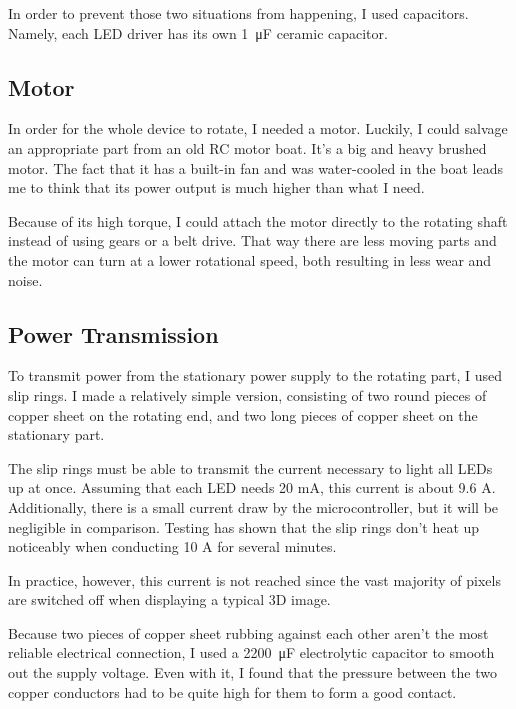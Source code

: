 \documentclass[a4paper, 11pt, titlepage]{report}
\begin{document}
In order to prevent those two situations from happening, I used capacitors. Namely, each LED
driver has its own \SI{1}{\micro\farad}  ceramic capacitor.



\subsection{Motor}

In order for the whole device to rotate, I needed a motor. Luckily, I could salvage an appropriate
part from an old RC motor boat. It's a big and heavy brushed motor. The fact that it has a built-in
fan and was water-cooled in the boat leads me to think that its power output is much higher than
what I need.

Because of its high torque, I could attach the motor directly to the rotating shaft instead of
using gears or a belt drive. That way there are less moving parts and the motor can turn at a lower
rotational speed, both resulting in less wear and noise.



\subsection{Power Transmission}

To transmit power from the stationary power supply to the rotating part, I used slip rings. I made
a relatively simple version, consisting of two round pieces of copper sheet on the rotating end,
and two long pieces of copper sheet on the stationary part.

The slip rings must be able to transmit the current necessary to light all LEDs up at once.
Assuming that each LED needs 20 mA, this current is about 9.6 A. Additionally, there is a small
current draw by the microcontroller, but it will be negligible in comparison. Testing has shown
that the slip rings don't heat up noticeably when conducting 10 A for several minutes.

In practice, however, this current is not reached since the vast majority of pixels are
switched off when displaying a typical 3D image.

Because two pieces of copper sheet rubbing against each other aren't the most reliable electrical
connection, I used a \SI{2200}{\micro\farad} electrolytic capacitor to smooth out the supply
voltage. Even with it, I found that the pressure between the two copper conductors had to be quite
high for them to form a good contact.
\end{document}
